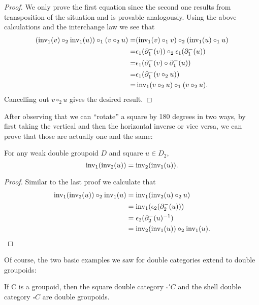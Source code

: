 \begin{proof}
We only prove the first equation since the second one results from transposition
of the situation and is provable analogously.
Using the above calculations and the interchange law we see that
\begin{align*}
(\operatorname{inv_1}(v) \circ_2 \operatorname{inv_1}(u)) \circ_1 (v \circ_2 u)
= 	& (\operatorname{inv_1}(v) \circ_1 v) \circ_2 (\operatorname{inv_1}(u) \circ_1 u) \\
= 	& \epsilon_1(\partial^-_1(v)) \circ_2 \epsilon_1(\partial^-_1(u)) \\
=	& \epsilon_1(\partial^-_1(v) \circ \partial^-_1(u)) \\
=	& \epsilon_1(\partial^-_1(v \circ_2 u)) \\
=	& \operatorname{inv_1}(v \circ_2 u) \circ_1 (v \circ_2 u) \text{.}
\end{align*}
Cancelling out $v \circ_2 u$ gives the desired result.
\end{proof}

After observing that we can ``rotate'' a square by 180 degrees in two ways, by first
taking the vertical and then the horizontal inverse or vice versa, we can prove
that those are actually one and the same:

\begin{lemma} \label{thm:rotate-180}
For any weak double groupoid $D$ and square $u \in D_2$,
\begin{equation*}
\operatorname{inv_1}(\operatorname{inv_2}(u)) = \operatorname{inv_2}(\operatorname{inv_1}(u)) \text{.}
\end{equation*}
\end{lemma}

\begin{proof}
Similar to the last proof we calculate that
\begin{align*}
\operatorname{inv_1}(\operatorname{inv_2}(u)) \circ_2 \operatorname{inv_1}(u)
	&= \operatorname{inv_1}(\operatorname{inv_2}(u) \circ_2 u) \\
	&= \operatorname{inv_1}(\epsilon_2(\partial^-_2(u))) \\
	&= \epsilon_2(\partial^-_2(u)^{-1}) \\
	&= \operatorname{inv_2}(\operatorname{inv_1}(u)) \circ_2 \operatorname{inv_1}(u) \text{.}
\end{align*}
\end{proof}

Of course, the two basic examples we saw for double categories extend to
double groupoids:
\begin{lemma} \label{thm:shell-dbl-gpd}
If C is a groupoid, then the square double category $\square' C$ and the
shell double category $\square C$ are double groupoids.
\end{lemma}

